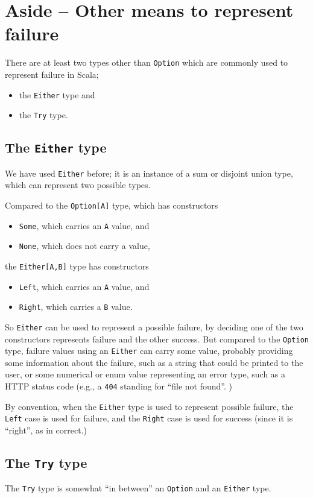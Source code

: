 \documentclass[11pt]{article}
\begin{document}
\section{Aside – Other means to represent failure}
\label{sec:org3860b46}
There are at least two types other than \texttt{Option} which
are commonly used to represent failure in Scala;
\begin{itemize}
\item the \texttt{Either} type and
\item the \texttt{Try} type.
\end{itemize}

\subsection{The \texttt{Either} type}
\label{sec:orgcc82a72}
We have used \texttt{Either} before; it is an instance of a sum or
disjoint union type, which can represent two possible types.

Compared to the \texttt{Option[A]} type, which has constructors
\begin{itemize}
\item \texttt{Some}, which carries an \texttt{A} value, and
\item \texttt{None}, which does not carry a value,
\end{itemize}
the \texttt{Either[A,B]} type has constructors
\begin{itemize}
\item \texttt{Left}, which carries an \texttt{A} value, and
\item \texttt{Right}, which carries a \texttt{B} value.
\end{itemize}

So \texttt{Either} can be used to represent a possible failure,
by deciding one of the two constructors represents failure
and the other success.
But compared to the \texttt{Option} type, failure values using
an \texttt{Either} can carry some value, probably providing
some information about the failure, such as
a string that could be printed to the user,
or some numerical or enum value representing an error type,
such as a HTTP status code (e.g., a \texttt{404} standing for “file not found”. )

By convention, when the \texttt{Either} type is used to represent
possible failure, the \texttt{Left} case is used for failure,
and the \texttt{Right} case is used for success (since it is “right”,
as in correct.)

\subsection{The \texttt{Try} type}
\label{sec:org5181eeb}
The \texttt{Try} type is somewhat “in between” an \texttt{Option} and an \texttt{Either} type.
\end{document}
